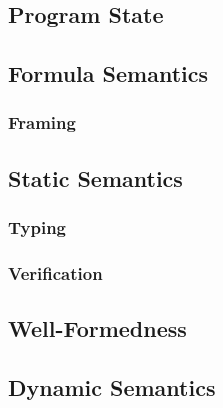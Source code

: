     \subsection{Program State}
    \label{ssec:program-state}
    
        
    \subsection{Formula Semantics}
    \label{ssec:formula-semantics}
    
    
        \subsubsection{Framing}
        \label{sssec:framing}
        
        
    
    \subsection{Static Semantics}
    \label{sec:static-semantics}
    
        
        \subsubsection{Typing}
        \label{sssec:typing}
        
    
        \subsubsection{Verification}
        \label{sssec:verification}
        
    
    \subsection{Well-Formedness}
    \label{sec:well-formedness}
    
    
    \subsection{Dynamic Semantics}
    \label{ssec:dynamic-semantics}
    
    
